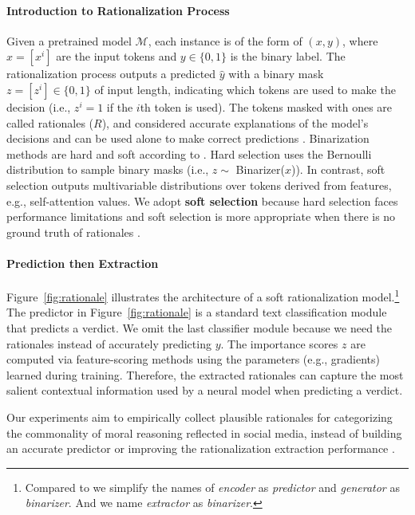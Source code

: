 \documentclass[letterpaper]{article} %
\begin{document}
\paragraph{Introduction to Rationalization Process}

Given a pretrained model $\mathcal{M}$, each instance is of the form of $(x, y)$, where $x=[x^{i}]$ are the input tokens and $y\in\{0,1\}$ is the binary label.
The rationalization process outputs a predicted $\hat{y}$ with a binary mask $z=[z^{i}]\in\{0,1\}$ of input length, indicating which tokens are used to make the decision (i.e., $z^{i}=1$ if the $i$th token is used).
The tokens masked with ones are called rationales ($R$), and considered accurate explanations of the model's decisions and can be used alone to make correct predictions \cite{jain-2020-learning}.
Binarization methods are hard and soft according to \citep{deyoung-2020-eraser}.
Hard selection uses the Bernoulli distribution to sample binary masks (i.e., $z\sim$ Binarizer($x$)).
In contrast, soft selection \cite{jain-2020-learning} outputs multivariable distributions over tokens derived from features, e.g., self-attention values.
We adopt \textbf{soft selection} because hard selection faces performance limitations \cite{jain-2020-learning} and soft selection is more appropriate when there is no ground truth of rationales \cite{jiang-2021-structurizing}.

\paragraph{Prediction then Extraction}

Figure~\ref{fig:rationale} illustrates the architecture of a soft rationalization model.\footnote{Compared to \citet{lei-2016-rationalizing} we simplify the names of \textsl{encoder} as \textsl{predictor} and \textsl{generator} as \textsl{binarizer}. And we name \textsl{extractor} \cite{jain-2020-learning} as \textsl{binarizer}.}
The predictor in Figure~\ref{fig:rationale} is a standard text classification module that predicts a verdict.
We omit the last classifier module because we need the rationales instead of accurately predicting $y$.
The importance scores $z$ are computed via feature-scoring methods using the parameters (e.g., gradients) learned during training.
Therefore, the extracted rationales can capture the most salient contextual information used by a neural model when predicting a verdict.

Our experiments aim to empirically collect plausible rationales for categorizing the commonality of moral reasoning reflected in social media, instead of building an accurate predictor \cite{botzer-2022-analysis} or improving the rationalization extraction performance \cite{atanasova-2020-diagnostic, chrysostomou-2022-flexible}.
\end{document}
